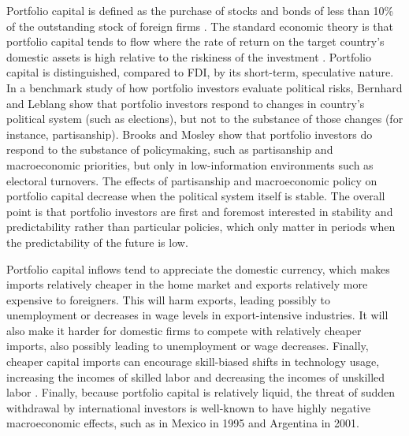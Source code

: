 \documentclass[a4paper]{article}\usepackage[]{graphicx}\usepackage[]{color}
\begin{document}
Portfolio capital is defined as the purchase of stocks and bonds of less than 10\% of the outstanding stock of foreign firms \parencites{kenen1994exchange}{Walther:1997wf}. The standard economic theory is that portfolio capital tends to flow where the rate of return on the target country's domestic assets is high relative to the riskiness of the investment \parencites[743]{mosley2003global}[685]{ISQU:ISQU420}. Portfolio capital is distinguished, compared to FDI, by its short-term, speculative nature. In a benchmark study of how portfolio investors evaluate political risks, Bernhard and Leblang \parencite*{Bernhard:2003kb} show that portfolio investors respond to changes in country's political system (such as elections), but not to the substance of those changes (for instance, partisanship). Brooks and Mosley \parencite*{Brooks:2007we} show that portfolio investors do respond to the substance of policymaking, such as partisanship and macroeconomic priorities, but only in low-information environments such as electoral turnovers. The effects of partisanship and macroeconomic policy on portfolio capital decrease when the political system itself is stable. The overall point is that portfolio investors are first and foremost interested in stability and predictability rather than particular policies, which only matter in periods when the predictability of the future is low.

Portfolio capital inflows tend to appreciate the domestic currency, which makes imports relatively cheaper in the home market and exports relatively more expensive to foreigners. This will harm exports, leading possibly to unemployment or decreases in wage levels in export-intensive industries. It will also make it harder for domestic firms to compete with relatively cheaper imports, also possibly leading to unemployment or wage decreases. Finally, cheaper capital imports can encourage skill-biased shifts in technology usage, increasing the incomes of skilled labor and decreasing the incomes of unskilled labor \parencites{Cragg:1996iy}{Ros:2000vy}. Finally, because portfolio capital is relatively liquid, the threat of sudden withdrawal by international investors is well-known to have highly negative macroeconomic effects, such as in Mexico in 1995 and Argentina in 2001.
\end{document}
